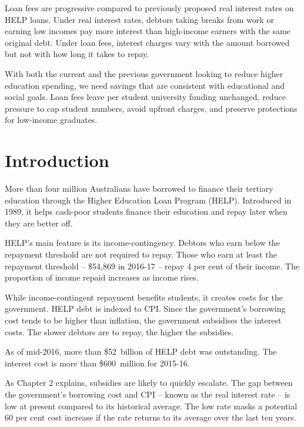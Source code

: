 \documentclass[embargoed]{grattan}
\begin{document}
\begin{overview}
Loan fees are progressive compared to previously proposed real interest rates on \gls{HELP} loans.
Under real interest rates, debtors taking breaks from work or earning low incomes pay more interest than high-income earners with the same original debt.
Under loan fees, interest charges vary with the amount borrowed but not with how long it takes to repay.

With both the current and the previous government looking to reduce higher education spending, we need savings that are consistent with educational and social goals.
Loan fees leave per student university funding unchanged, reduce pressure to cap student numbers, avoid upfront charges, and preserve protections for low-income graduates.
\end{overview}

\contentspage



\chapter{{Introduction}}\label{introduction}

More than four million Australians have borrowed to finance their tertiary education through the Higher Education Loan Program (HELP).
Introduced in 1989, it helps cash-poor students finance their education and repay later when they are better off.

\gls{HELP}'s main feature is its income-contingency.
Debtors who earn below the repayment threshold are not required to repay.
Those who earn at least the repayment threshold -- \$54,869 in 2016-17 -- repay 4 per cent of their income.
The proportion of income repaid increases as income rises.

While income-contingent repayment benefits students, it creates costs for the government.
\gls{HELP} debt is indexed to \gls{CPI}.
Since the government's borrowing cost tends to be higher than inflation, the government subsidises the interest costs.
The slower debtors are to repay, the higher the subsidies.

As of mid-2016, more than \$52~billion of \gls{HELP} debt was outstanding.
The interest cost is more than \$600~million for 2015-16.

As Chapter 2 explains, subsidies are likely to quickly escalate.
The gap between the government's borrowing cost and \gls{CPI} -- known as the real interest rate -- is low at present compared to its historical average.
The low rate masks a potential 60 per cent cost increase if the rate returns to its average over the last ten years.
\end{document}
